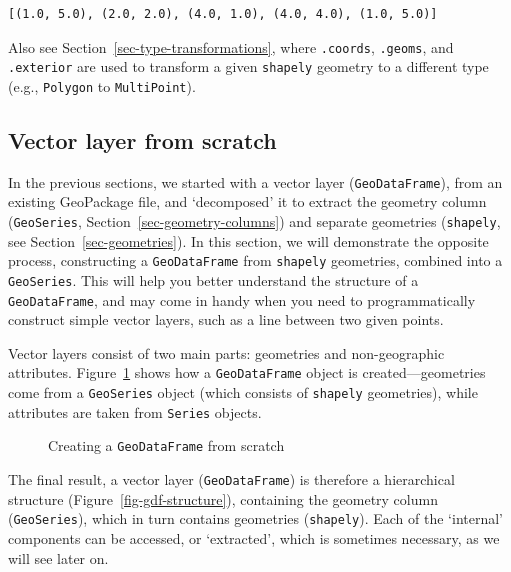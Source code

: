 \documentclass[
  letterpaper,
]{krantz}
\begin{document}
\begin{verbatim}
[(1.0, 5.0), (2.0, 2.0), (4.0, 1.0), (4.0, 4.0), (1.0, 5.0)]
\end{verbatim}

Also see Section~\ref{sec-type-transformations}, where \texttt{.coords},
\texttt{.geoms}, and \texttt{.exterior} are used to transform a given
\texttt{shapely} geometry to a different type (e.g.,
\texttt{\textquotesingle{}Polygon\textquotesingle{}} to
\texttt{\textquotesingle{}MultiPoint\textquotesingle{}}).

\subsection{Vector layer from
scratch}\label{sec-vector-layer-from-scratch}

In the previous sections, we started with a vector layer
(\texttt{GeoDataFrame}), from an existing GeoPackage file, and
`decomposed' it to extract the geometry column (\texttt{GeoSeries},
Section~\ref{sec-geometry-columns}) and separate geometries
(\texttt{shapely}, see Section~\ref{sec-geometries}). In this section,
we will demonstrate the opposite process, constructing a
\texttt{GeoDataFrame} from \texttt{shapely} geometries, combined into a
\texttt{GeoSeries}. This will help you better understand the structure
of a \texttt{GeoDataFrame}, and may come in handy when you need to
programmatically construct simple vector layers, such as a line between
two given points.

Vector layers consist of two main parts: geometries and non-geographic
attributes. Figure~\ref{fig-gdf-flow} shows how a \texttt{GeoDataFrame}
object is created---geometries come from a \texttt{GeoSeries} object
(which consists of \texttt{shapely} geometries), while attributes are
taken from \texttt{Series} objects.

\begin{figure}


\caption{\label{fig-gdf-flow}Creating a \texttt{GeoDataFrame} from
scratch}

\end{figure}%

The final result, a vector layer (\texttt{GeoDataFrame}) is therefore a
hierarchical structure (Figure~\ref{fig-gdf-structure}), containing the
geometry column (\texttt{GeoSeries}), which in turn contains geometries
(\texttt{shapely}). Each of the `internal' components can be accessed,
or `extracted', which is sometimes necessary, as we will see later on.
\end{document}
